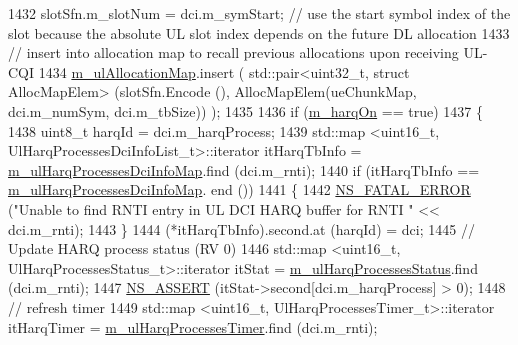 \begin{DoxyCode}
1432                         slotSfn.m\_slotNum = dci.m\_symStart;  \textcolor{comment}{// use the start symbol index of the slot
       because the absolute UL slot index depends on the future DL allocation}
1433                         \textcolor{comment}{// insert into allocation map to recall previous allocations upon receiving UL-CQI}
1434                         \hyperlink{classns3_1_1MmWaveFlexTtiMaxWeightMacScheduler_ac8ae3992d5f26804eff2d4cab3309777}{m\_ulAllocationMap}.insert ( std::pair<uint32\_t, struct
       AllocMapElem> (slotSfn.Encode (), AllocMapElem(ueChunkMap, dci.m\_numSym, dci.m\_tbSize)) );
1435 
1436                         \textcolor{keywordflow}{if} (\hyperlink{classns3_1_1MmWaveFlexTtiMaxWeightMacScheduler_af63eec946bdf0fb2db0c66104e95f1a6}{m\_harqOn} == \textcolor{keyword}{true})
1437                         \{
1438                                 uint8\_t harqId = dci.m\_harqProcess;
1439                                 std::map <uint16\_t, UlHarqProcessesDciInfoList\_t>::iterator itHarqTbInfo = 
      \hyperlink{classns3_1_1MmWaveFlexTtiMaxWeightMacScheduler_a637f826b85b2eeb88c80b53b468fdfcf}{m\_ulHarqProcessesDciInfoMap}.find (dci.m\_rnti);
1440                                 \textcolor{keywordflow}{if} (itHarqTbInfo == \hyperlink{classns3_1_1MmWaveFlexTtiMaxWeightMacScheduler_a637f826b85b2eeb88c80b53b468fdfcf}{m\_ulHarqProcessesDciInfoMap}.
      end ())
1441                                 \{
1442                                         \hyperlink{group__fatal_ga5131d5e3f75d7d4cbfd706ac456fdc85}{NS\_FATAL\_ERROR} (\textcolor{stringliteral}{"Unable to find RNTI entry in UL DCI
       HARQ buffer for RNTI "} << dci.m\_rnti);
1443                                 \}
1444                                 (*itHarqTbInfo).second.at (harqId) = dci;
1445                                 \textcolor{comment}{// Update HARQ process status (RV 0)}
1446                                 std::map <uint16\_t, UlHarqProcessesStatus\_t>::iterator itStat = 
      \hyperlink{classns3_1_1MmWaveFlexTtiMaxWeightMacScheduler_aeff65837d6604471dd667bfe89240de2}{m\_ulHarqProcessesStatus}.find (dci.m\_rnti);
1447                                 \hyperlink{assert_8h_a6dccdb0de9b252f60088ce281c49d052}{NS\_ASSERT} (itStat->second[dci.m\_harqProcess] > 0);
1448                                 \textcolor{comment}{// refresh timer}
1449                                 std::map <uint16\_t, UlHarqProcessesTimer\_t>::iterator itHarqTimer =  
      \hyperlink{classns3_1_1MmWaveFlexTtiMaxWeightMacScheduler_aa609a40ebf5eb905696d2db4e1443961}{m\_ulHarqProcessesTimer}.find (dci.m\_rnti);

\end{DoxyCode}
